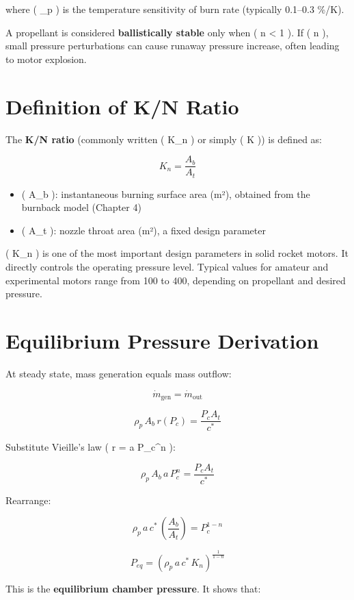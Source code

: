 \documentclass[
  letterpaper,
  DIV=11,
  numbers=noendperiod]{scrreprt}
\providecommand{\tightlist}{%
  \setlength{\itemsep}{0pt}\setlength{\parskip}{0pt}}
\begin{document}
where ( \sigma\_p ) is the temperature sensitivity of burn rate
(typically 0.1--0.3 \%/K).

A propellant is considered \textbf{ballistically stable} only when ( n
\textless{} 1 ). If ( n  ), small pressure perturbations can cause
runaway pressure increase, often leading to motor explosion.

\section{Definition of K/N Ratio}\label{definition-of-kn-ratio}

The \textbf{K/N ratio} (commonly written ( K\_n ) or simply ( K )) is
defined as:

\[
K_n = \frac{A_b}{A_t}
\]

\begin{itemize}
\tightlist
\item
  ( A\_b ): instantaneous burning surface area (m²), obtained from the
  burnback model (Chapter 4)
\item
  ( A\_t ): nozzle throat area (m²), a fixed design parameter
\end{itemize}

( K\_n ) is one of the most important design parameters in solid rocket
motors. It directly controls the operating pressure level. Typical
values for amateur and experimental motors range from 100 to 400,
depending on propellant and desired pressure.

\section{Equilibrium Pressure
Derivation}\label{equilibrium-pressure-derivation}

At steady state, mass generation equals mass outflow:

\[
\dot{m}_\text{gen} = \dot{m}_\text{out}
\]

\[
\rho_p \, A_b \, r(P_c) = \frac{P_c A_t}{c^*}
\]

Substitute Vieille's law ( r = a P\_c\^{}n ):

\[
\rho_p \, A_b \, a \, P_c^n = \frac{P_c A_t}{c^*}
\]

Rearrange:

\[
\rho_p \, a \, c^* \, \left( \frac{A_b}{A_t} \right) = P_c^{1-n}
\]

\[
P_{eq} = \left( \rho_p \, a \, c^* \, K_n \right)^{\frac{1}{1-n}}
\]

This is the \textbf{equilibrium chamber pressure}. It shows that:
\end{document}
